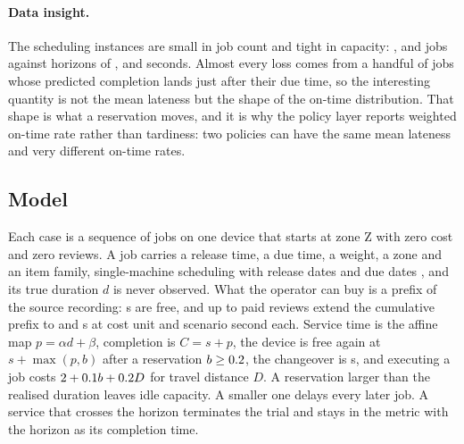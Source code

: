 \documentclass{swmcmthesis}
\begin{document}
\paragraph{Data insight.} The scheduling instances are small in job count and tight in
capacity: \slotJobsSOne{}, \slotJobsSTwo{} and \slotJobsSThree{} jobs against horizons of
\slotHSOne{}, \slotHSTwo{} and \slotHSThree{} seconds. Almost every loss comes from a
handful of jobs whose predicted completion lands just after their due time, so the
interesting quantity is not the mean lateness but the shape of the on-time
distribution. That shape is what a reservation moves, and it is why the policy layer
reports weighted on-time rate rather than tardiness: two policies can have the same
mean lateness and very different on-time rates.

\subsection{Model}
\label{sec:p3model}

Each case is a sequence of jobs on one device that starts at zone
Z\slotZoneZero{} with zero cost and zero reviews. A job carries a release time, a
due time, a weight, a zone and an item family, single-machine scheduling with release dates and due dates \cite{pinedo2022}, and its true duration $d$ is never
observed. What the operator can buy is a prefix of the source recording: \slotPrefixFree{} s are free, and up to \slotMaxReviewsPerJob{} paid reviews extend
the cumulative prefix to \slotPrefixMid{} and \slotPrefixLong{} s at
\slotReviewCost{} cost unit and \slotReviewDelay{} scenario second each. Service time
is the affine map $p=\alpha d+\beta$, completion is $C=s+p$, the device is free again
at $s+\max(p,b)$ after a reservation $b\ge0.2$, the changeover is
\slotChangeOver{} s, and executing a job costs $2{}+0.1 b+0.2 D$
for travel distance $D$. A reservation larger than the realised duration leaves idle
capacity. A smaller one delays every later job. A service that crosses the horizon
terminates the trial and stays in the metric with the horizon as its completion time.
\end{document}
